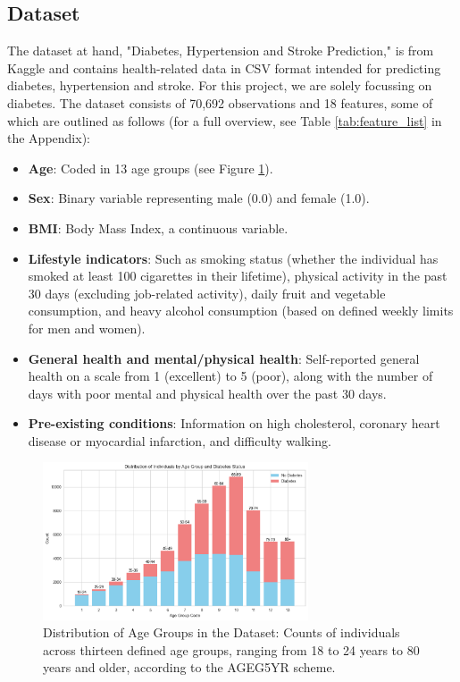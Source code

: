 \documentclass[a4paper,12pt]{article}
\begin{document}
\subsection{Dataset}
The dataset at hand, "Diabetes, Hypertension and Stroke Prediction," is from Kaggle and contains 
health-related data in CSV format intended for predicting diabetes, hypertension and stroke. 
For this project, we are solely focussing on diabetes. The dataset consists of 70,692 observations 
and 18 features, some of which are outlined as follows (for a full overview, see Table \ref{tab:feature_list} in the Appendix):
\begin{itemize}
    \item \textbf{Age}: Coded in 13 age groups (see Figure \ref{fig:age_groups}).
    \item \textbf{Sex}: Binary variable representing male (0.0) and female (1.0).
    \item \textbf{BMI}: Body Mass Index, a continuous variable.
    \item \textbf{Lifestyle indicators}: Such as smoking status (whether the individual has smoked 
    at least 100 cigarettes in their lifetime), physical activity in the past 30 days 
    (excluding job-related activity), daily fruit and vegetable consumption, and heavy alcohol 
    consumption (based on defined weekly limits for men and women).
    \item \textbf{General health and mental/physical health}: Self-reported general health on a 
    scale from 1 (excellent) to 5 (poor), along with the number of days with poor mental and 
    physical health over the past 30 days.
    \item \textbf{Pre-existing conditions}: Information on high cholesterol, coronary heart 
    disease or myocardial infarction, and difficulty walking.
\end{itemize}

\begin{figure}[h!]
    \centering
    \includegraphics[width=0.7\textwidth]{plot_age_groups.png}
    \caption{Distribution of Age Groups in the Dataset: Counts of individuals across thirteen defined age groups, 
    ranging from 18 to 24 years to 80 years and older, according to the AGEG5YR scheme.}
    \label{fig:age_groups}
\end{figure}
\end{document}
